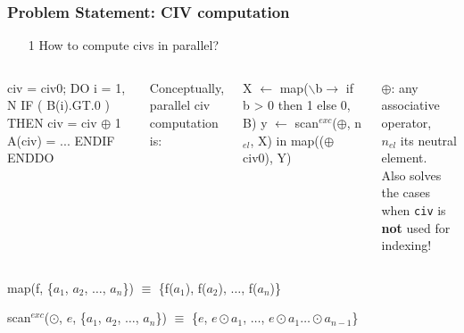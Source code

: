 \documentclass{beamer}
\renewcommand{\emph}[1]{\textcolor{structure}{#1}}
\newcommand{\emp}[1]{\textcolor{DikuRed}{ #1}}
\newcommand{\emphh}[1]{\textcolor{CosGreen}{ #1}}
\newcommand{\mymath}[1]{$ #1 $}
\newcommand{\myindx}[1]{_{#1}}
\newcommand{\myindu}[1]{^{#1}}
\begin{document}
\begin{frame}[fragile,t]
  \frametitle{Problem Statement: CIV computation}

\begin{itemize}
    \item[\emp{1}] \emp{How to compute {\sc civ}s in parallel?}
\end{itemize}
\bigskip\pause

\begin{columns}
\begin{colorcode}[fontsize=\small]
civ = civ0;
DO i = 1, N
  \emp{IF ( B(i).GT.0 ) THEN}
    \emp{civ = civ \mymath{\oplus} 1}
    A(civ) = ...
  \emp{ENDIF} 
ENDDO
\end{colorcode}
Conceptually, parallel {\sc civ} computation is:\\
\begin{colorcode}[fontsize=\small]
X \mymath{\leftarrow} \emphh{map}(\mymath{\backslash}b\mymath{\rightarrow}\emp{if b > 0 then 1 else 0}, B)
y \mymath{\leftarrow} \emphh{scan}\mymath{\myindu{exc}}(\mymath{\oplus}, n\mymath{\myindx{el}}, X)
in \emphh{map}((\mymath{\oplus} civ0), Y)
\end{colorcode}
$\oplus$: any associative operator,\\
$n_{el}$ its neutral element.\\
\medskip
\emphh{Also solves the cases when {\tt civ} is {\bf not} used for indexing!}
\end{columns}
\bigskip
\bigskip

\emphh{map}(f, \{$a_1$, $a_2$, $\ldots$, $a_n$\}) $\equiv$ \emph{\{f($a_1$), f($a_2$), $\ldots$, f($a_n$)\}}
\medskip

\emphh{scan$^{exc}$}($\odot$, $e$, \{$a_1$, $a_2$, $\ldots$, $a_n$\}) $\equiv$ \emph{\{$e$, $e \odot a_1$, $\ldots$, $e \odot a_1 \ldots \odot a_{n-1}$\}}

\end{frame}
\end{document}
